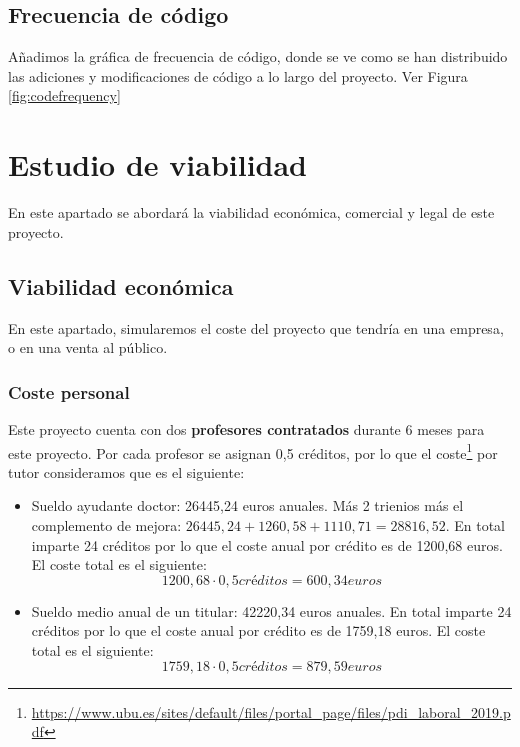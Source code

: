 \subsection{Frecuencia de código}
Añadimos la gráfica de frecuencia de código, donde se ve como se han distribuido las adiciones y modificaciones de código a lo largo del proyecto. Ver Figura \ref{fig:codefrequency}


\section{Estudio de viabilidad}
En este apartado se abordará la viabilidad económica, comercial y legal de este proyecto.

\subsection{Viabilidad económica}
En este apartado, simularemos el coste del proyecto que tendría en una empresa, o en una venta al público.
\subsubsection{Coste personal}
Este proyecto cuenta con dos \textbf{profesores contratados} durante 6 meses para este proyecto. Por cada profesor se asignan 0,5 créditos, por lo que el coste\footnote{\url{https://www.ubu.es/sites/default/files/portal_page/files/pdi_laboral_2019.pdf}} por tutor consideramos que es el siguiente:
\begin{itemize}
\item Sueldo ayudante doctor: 26445,24 euros anuales. Más 2 trienios más el complemento de mejora: $26445,24 + 1260,58 + 1110,71 = 28816,52$. En total imparte 24 créditos por lo que el coste anual por crédito es de 1200,68 euros. El coste total es el siguiente:
\begin{equation}
1200,68 \cdot 0,5 créditos = 600,34 euros
\end{equation}
\item Sueldo medio anual de un titular: 42220,34 euros anuales. En total imparte 24 créditos por lo que el coste anual por crédito es de 1759,18 euros. El coste total es el siguiente:
\begin{equation}
1759,18 \cdot 0,5 créditos = 879,59 euros
\end{equation}
\end{itemize}

